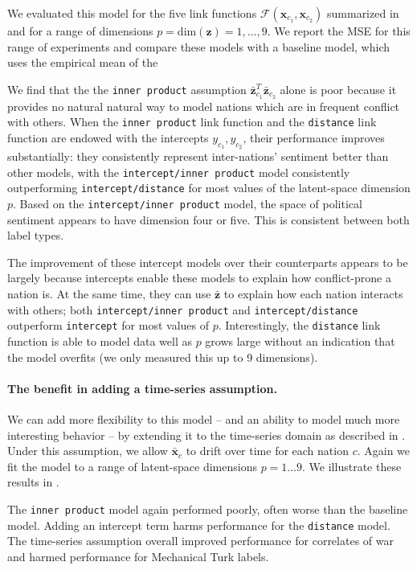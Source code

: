 We evaluated this model for the five link functions $\mathcal{F}(\bm
x_{c_1}, \bm x_{c_2})$ summarized in  and for
a range of dimensions $p = \mbox{dim}(\bm z) = 1, \ldots, 9$.  We
report the MSE for this range of experiments
 and compare these models with a
baseline model, which uses the empirical mean of the 

We find that the the
\verb!inner product!  assumption $\bm \bar z_{c_1}^T \bm \bar z_{c_2}$
alone is poor because it provides no natural natural way to model
nations which are in frequent conflict with others.  When the
\verb!inner product! link function and the \verb!distance! link
function are endowed with the intercepts $y_{c_1}, y_{c_2}$, their
performance improves substantially: they consistently represent
inter-nations' sentiment better than other models, with the
\verb!intercept/inner product!  model consistently outperforming
\verb!intercept/distance! for most values of the latent-space
dimension $p$. Based on the \verb!intercept/inner product! model, the
space of political sentiment appears to have dimension four or five.
This is consistent between both label types.

The improvement of these intercept models over their counterparts
appears to be largely because intercepts enable these models to
explain how conflict-prone a nation is. At the same time, they can use
$\bm \bar z$ to explain how each nation interacts with others; both
\verb!intercept/inner product!  and \verb!intercept/distance!
outperform \verb!intercept! for most values of $p$.  Interestingly,
the \verb!distance! link function is able to model data well as $p$
grows large without an indication that the model overfits (we only
measured this up to 9 dimensions).


\paragraph{The benefit in adding a time-series assumption.}
We can add more flexibility to this model -- and an ability to model
much more interesting behavior -- by extending it to the time-series
domain as described in .  Under this
assumption, we allow $\bm \bar x_c$ to drift over time for each
nation $c$.  Again we fit the model to a range of latent-space
dimensions $p = 1 \ldots 9$. We illustrate these results in
.

The \verb!inner product! model again performed poorly, often worse than the
baseline model.  Adding an intercept term harms performance for the
\verb!distance! model.  The time-series assumption overall improved
performance for correlates of war and harmed performance for
Mechanical Turk labels.


